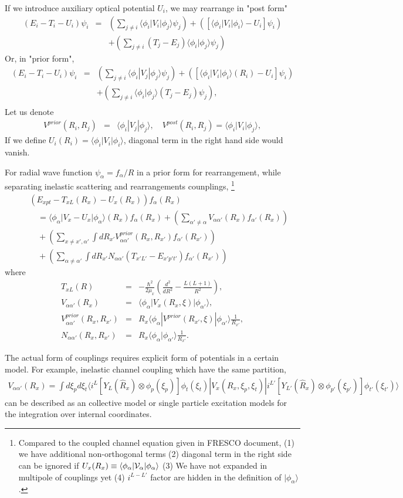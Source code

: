 \documentclass[11pt]{book}
\def\la{\langle}
\def\ra{\rangle}
\newcommand{\bea}{\begin{eqnarray}}
\newcommand{\eea}{\end{eqnarray}}
\newcommand{\no}{\nonumber \\}
\begin{document}
If we introduce auxiliary optical potential $U_i$, we may rearrange in "post form"
\bea 
(E_i-T_i-U_i)\psi_i
&=& \left( \sum_{j\neq i} \la \phi_i|V_i|\phi_j\ra \psi_j \right)
+\left( [\la\phi_i|V_i|\phi_i\ra-U_i]\psi_i \right) \no & &
+\left( \sum_{j\neq i}  (T_j-E_j)\la \phi_i|\phi_j\ra \psi_j \right)
\eea 
Or, in "prior form",
\bea     
(E_i-T_i-U_i)\psi_i
&=& \left( \sum_{j\neq i} \la \phi_i|V_j|\phi_j\ra \psi_j \right)
+\left( [\la\phi_i|V_i|\phi_i\ra(R_i)-U_i]\psi_i \right) 
\no & & 
+\left( \sum_{j\neq i}  \la \phi_i|\phi_j\ra  (T_j-E_j)\psi_j \right) ,\no   
\eea 
Let us denote 
\bea 
V^{prior}(R_i,R_j)&=&\la \phi_i|V_j|\phi_j\ra,\quad 
V^{post}(R_i,R_j)=\la \phi_i|V_i|\phi_j\ra,
\eea 
If we define $U_i(R_i)=\la \phi_i|V_i|\phi_i\ra$, 
diagonal term in the right hand side would vanish. 

For radial wave function $\psi_\alpha=f_\alpha/R$ in a prior form for rearrangement, 
while separating inelastic scattering and rearrangements counplings,
\footnote{Compared to the coupled channel equation given in FRESCO document,
	(1) we have additional non-orthogonal terms (2) diagonal term in the right side can be
	ignored if $U_x(R_x)\equiv \la \phi_\alpha|{\cal V}_\alpha|\phi_\alpha\ra $
	(3) We have not expanded in multipole of couplings yet (4) $i^{L-L'}$ factor 
	are hidden in the definition of $|\phi_\alpha\ra$. 	
	
}   
\bea 
& &(E_{xpt}-T_{xL}(R_x)-U_x(R_x))f_\alpha(R_x) \no 
& &\quad =\la \phi_\alpha| V_x-U_x|\phi_\alpha\ra(R_x) f_\alpha(R_x) 
+\left( \sum_{\alpha'\neq \alpha} V_{\alpha \alpha'}(R_x)f_{\alpha'}(R_x)\right) 
\no 
& &\quad  +\left(\sum_{x\neq x',\alpha' }\int dR_{x'}  V^{prior}_{\alpha\alpha'}(R_x,R_{x'})
f_{\alpha'}(R_{x'})\right) 
\no & &\quad               
+\left( \sum_{\alpha\neq \alpha'}\int dR_{x'} N_{\alpha\alpha'}(T_{x'L'}-E_{x'p't'})f_{\alpha'}(R_{x'})\right)    
\eea 
where
\bea 
T_{xL}(R)&=&-\frac{\hbar^2}{2\mu_x}\left( \frac{d^2}{dR^2}-\frac{L(L+1)}{R^2}\right),\no 
V_{\alpha\alpha'}(R_x)&=&\la \phi_\alpha|V_x(R_x,\xi)|\phi_{\alpha'}\ra ,\no 
V^{prior}_{\alpha\alpha'}(R_x,R_{x'})&=& R_{x}
\la \phi_\alpha|V^{prior}(R_{x'},\xi)|\phi_{\alpha'}\ra\frac{1}{R_{x'}},\no 
N_{\alpha\alpha'}(R_x,R_{x'})&=& R_x\la \phi_\alpha|\phi_{\alpha'}\ra \frac{1}{R_{x'}}.                     
\eea 

The actual form of couplings requires explicit form of potentials in a certain model.
For example, inelastic channel coupling which have the same partition, 
\bea 
V_{\alpha\alpha'}(R_x)=\int d\xi_p d\xi_t \la i^{L} [Y_L(\hat{R}_x)\otimes \phi_p(\xi_p)]\phi_t(\xi_t)|
V_x(R_x,\xi_p,\xi_t)|i^{L'} 
[Y_{L'}(\hat{R}_{x})\otimes \phi_{p'}(\xi_{p'})]\phi_{t'}(\xi_{t'})\ra 
\eea 
can be described as an collective model or single particle excitation models
for the integration over internal coordinates. 
\end{document}
